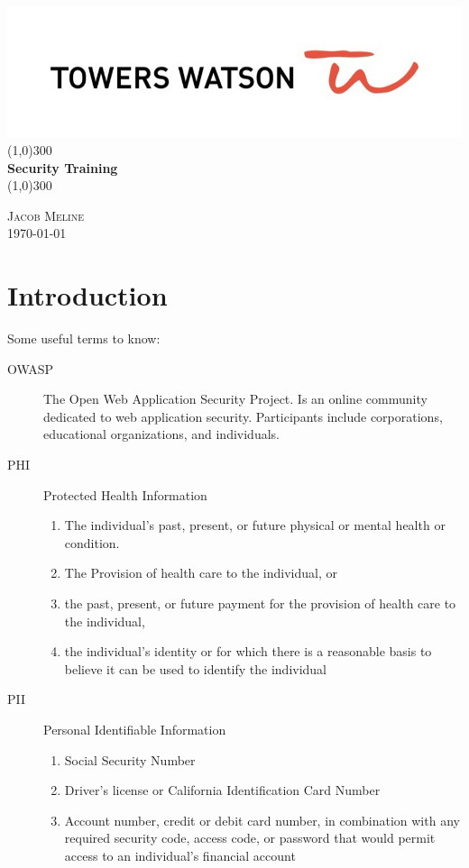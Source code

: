 \documentclass[a4paper, titlepage]{article}
\begin{document}
\begin{titlepage}
    \begin{center}
        \includegraphics[width=0.5\linewidth]{Towers-watson}
        \line(1,0){300} \\
        [0.25in]
        \huge{\bfseries Security Training} \\
        [2mm]
        \line(1,0){300} \\
        [10cm]
    \end{center}
    \begin{flushright}
        \textsc{\large Jacob Meline } \\
        \today
    \end{flushright}
\end{titlepage}

\tableofcontents
\thispagestyle{empty}
\cleardoublepage
\setcounter{page}{1}

\section{Introduction}\label{sec:intro}
Some useful terms to know:
\begin{description}
    \item[OWASP] The Open Web Application Security Project. Is an online community dedicated to web application security. Participants include corporations, educational organizations, and individuals.

    \item[PHI] Protected Health Information
    \begin{enumerate}
        \item The individual's past, present, or future physical or mental health or condition.
        \item The Provision of health care to the individual, or
        \item the past, present, or future payment for the provision of health care to the individual,
        \item the individual's identity or for which there is a reasonable basis to believe it can be used to identify the individual
    \end{enumerate}
    \item[PII] Personal Identifiable Information
    \begin{enumerate}
        \item Social Security Number
        \item Driver's license or California Identification Card Number
        \item Account number, credit or debit card number, in combination with any required security code, access code, or password that would permit access to an individual's financial account
    \end{enumerate}

\end{description}
\end{document}

